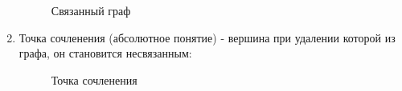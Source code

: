 \documentclass[a4paper]{article}
\begin{document}
\begin{enumerate}
\begin{figure}[!h]
      \caption{Связанный граф}
    \end{figure}
  \item Точка сочленения (абсолютное понятие) - вершина при удалении которой из графа, он становится несвязанным:
    \begin{figure}[!h]
      \caption{Точка сочленения}
    \end{figure}
\end{enumerate}
\newpage
\end{document}

